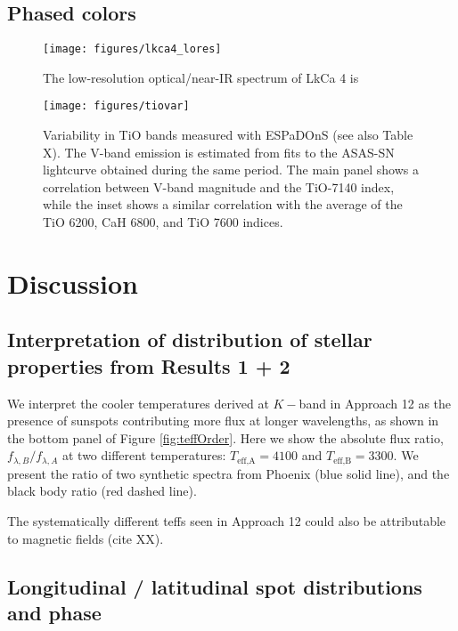 \documentclass[onecolumn]{emulateapj}%
\begin{document}
\subsection{Phased colors}



\begin{figure*}
	\centering
	\texttt{[image: figures/lkca4\_lores]} 
	\vspace{-100mm}
	\caption{The low-resolution optical/near-IR spectrum of LkCa 4 is }
	\label{fig:lores}
\end{figure*}



\begin{figure*}
	\centering
	\texttt{[image: figures/tiovar]} 
	\vspace{-100mm}
	\caption{Variability in TiO bands measured with ESPaDOnS (see also Table X).  The V-band emission is estimated from fits to the ASAS-SN lightcurve obtained during the same period.  The main panel shows a correlation between V-band magnitude and the TiO-7140 index, while the inset shows a similar correlation with the average of the TiO 6200, CaH 6800, and TiO 7600 indices.}
	\label{fig:tiovar}
\end{figure*}




\section{Discussion}

\subsection{Interpretation of distribution of stellar properties from Results 1 + 2}

We interpret the cooler temperatures derived at $K-$band in Approach 12 as the presence of sunspots contributing more flux at longer wavelengths, as shown in the bottom panel of Figure \ref{fig:teffOrder}.  Here we show the absolute flux ratio, $f_{\lambda, B} / f_{\lambda, A}$ at two different temperatures: $T_\textrm{eff,A} = 4100$ and $T_\textrm{eff,B} = 3300$.  We present the ratio of two synthetic spectra from Phoenix (blue solid line), and the black body ratio (red dashed line).  

The systematically different teffs seen in Approach 12 could also be attributable to magnetic fields (cite XX).

\subsection{Longitudinal / latitudinal spot distributions and phase}
\end{document}
